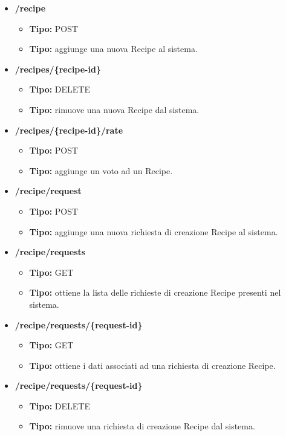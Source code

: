 \begin{itemize}
  \item \textbf{/recipe}
  \begin{itemize}
    \item \textbf{Tipo:} POST
    \item \textbf{Tipo:} aggiunge una nuova Recipe al sistema.
  \end{itemize}
  \item \textbf{/recipes/\{recipe-id\}}
  \begin{itemize}
    \item \textbf{Tipo:} DELETE
    \item \textbf{Tipo:} rimuove una nuova Recipe dal sistema.
  \end{itemize}
  \item \textbf{/recipes/\{recipe-id\}/rate}
  \begin{itemize}
    \item \textbf{Tipo:} POST
    \item \textbf{Tipo:} aggiunge un voto ad un Recipe.
  \end{itemize}


  \item \textbf{/recipe/request}
  \begin{itemize}
    \item \textbf{Tipo:} POST
    \item \textbf{Tipo:} aggiunge una nuova richiesta di creazione Recipe al sistema.
  \end{itemize}
  \item \textbf{/recipe/requests}
  \begin{itemize}
    \item \textbf{Tipo:} GET
    \item \textbf{Tipo:} ottiene la lista delle richieste di creazione Recipe presenti nel sistema.
  \end{itemize}
  \item \textbf{/recipe/requests/\{request-id\}}
  \begin{itemize}
    \item \textbf{Tipo:} GET
    \item \textbf{Tipo:} ottiene i dati associati ad una richiesta di creazione Recipe.
  \end{itemize}
  \item \textbf{/recipe/requests/\{request-id\}}
  \begin{itemize}
    \item \textbf{Tipo:} DELETE
    \item \textbf{Tipo:} rimuove una richiesta di creazione Recipe dal sistema.
  \end{itemize}

\end{itemize}
